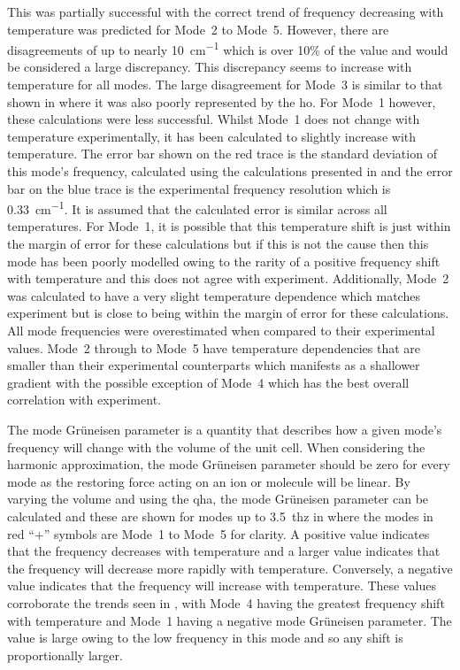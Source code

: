 This was partially successful with the correct trend of frequency decreasing with temperature was predicted for Mode~2 to Mode~5. However, there are disagreements of up to nearly \SI{10}{cm^{-1}} which is over 10\% of the value and would be considered a large discrepancy. This discrepancy seems to increase with temperature for all modes. The large disagreement for Mode~3 is similar to that shown in  where it was also poorly represented by the \acrshort{ho}. For Mode~1 however, these calculations were less successful. Whilst Mode~1 does not change with temperature experimentally, it has been calculated to slightly increase with temperature. The error bar shown on the red trace is the standard deviation of this mode's frequency, calculated using the calculations presented in  and the error bar on the blue trace is the experimental frequency resolution which is \SI{0.33}{cm^{-1}}. It is assumed that the calculated error is similar across all temperatures. For Mode~1, it is possible that this temperature shift is just within the margin of error for these calculations but if this is not the cause then this mode has been poorly modelled owing to the rarity of a positive frequency shift with temperature and this does not agree with experiment. Additionally, Mode~2 was calculated to have a very slight temperature dependence which matches experiment but is close to being within the margin of error for these calculations. All mode frequencies were overestimated when compared to their experimental values. Mode~2 through to Mode~5 have temperature dependencies that are smaller than their experimental counterparts which manifests as a shallower gradient with the possible exception of Mode~4 which has the best overall correlation with experiment.

The mode Gr\"uneisen parameter is a quantity that describes how a given mode's frequency will change with the volume of the unit cell. When considering the harmonic approximation, the mode Gr\"uneisen parameter should be zero for every mode as the restoring force acting on an ion or molecule will be linear. By varying the volume and using the \acrshort{qha}, the mode Gr\"uneisen parameter can be calculated and these are shown for modes up to \SI{3.5}{\acrshort{thz}} in  where the modes in red ``+'' symbols are Mode~1 to Mode~5 for clarity. A positive value indicates that the frequency decreases with temperature and a larger value indicates that the frequency will decrease more rapidly with temperature. Conversely, a negative value indicates that the frequency will increase with temperature. These values corroborate the trends seen in , with Mode~4 having the greatest frequency shift with temperature and Mode~1 having a negative mode Gr\"uneisen parameter. The value is large owing to the low frequency in this mode and so any shift is proportionally larger.

